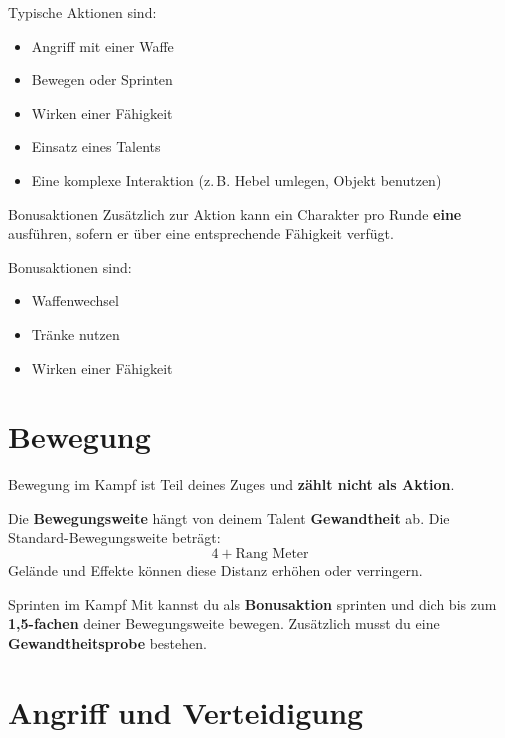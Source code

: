 Typische Aktionen sind:
\begin{itemize}
	\item Angriff mit einer Waffe
	\item Bewegen oder Sprinten
	\item Wirken einer Fähigkeit
	\item Einsatz eines Talents
	\item Eine komplexe Interaktion (z.\,B. Hebel umlegen, Objekt benutzen)
\end{itemize}

\begin{rulebox}{Bonusaktionen}
	Zusätzlich zur Aktion kann ein Charakter pro Runde \textbf{eine} 
	ausführen, sofern er über eine entsprechende Fähigkeit verfügt.
\end{rulebox}

Bonusaktionen sind:
\begin{itemize}
	\item Waffenwechsel
	\item Tränke nutzen
	\item Wirken einer Fähigkeit
\end{itemize}

\section{Bewegung}

\begin{rulebox}{Bewegung im Kampf}
	 ist Teil deines Zuges und \textbf{zählt nicht als Aktion}.
\end{rulebox}

Die \textbf{Bewegungsweite} hängt von deinem Talent \textbf{Gewandtheit} ab.
Die Standard-Bewegungsweite beträgt:
\[
4 + \text{Rang} \text{ Meter}
\]
Gelände und Effekte können diese Distanz erhöhen oder verringern.

\begin{rulebox}{Sprinten im Kampf}
	Mit  kannst du als \textbf{Bonusaktion} sprinten und dich
	bis zum \textbf{1,5-fachen} deiner Bewegungsweite bewegen. Zusätzlich musst du eine
	\textbf{Gewandtheitsprobe} bestehen.
\end{rulebox}


\section{Angriff und Verteidigung}

